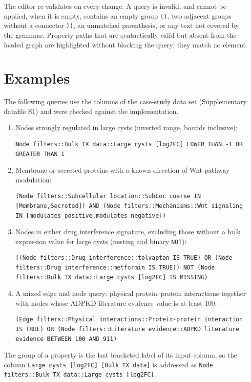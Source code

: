 \documentclass[10pt]{article}
\begin{document}
The editor re-validates on every change. A query is invalid, and cannot be
applied, when it is empty, contains an empty group \texttt{()}, two adjacent
groups without a connector \texttt{)(}, an unmatched parenthesis, or any text
not covered by the grammar. Property paths that are syntactically valid but
absent from the loaded graph are highlighted without blocking the query; they
match no element.

\section*{Examples}

The following queries use the columns of the case-study data set
(Supplementary datafile S1) and were checked against the implementation.

\begin{enumerate}
  \item Nodes strongly regulated in large cysts (inverted range, bounds
    inclusive):
\begin{lstlisting}
Node filters::Bulk TX data::Large cysts [log2FC] LOWER THAN -1 OR GREATER THAN 1
\end{lstlisting}
  \item Membrane or secreted proteins with a known direction of Wnt pathway
    modulation:
\begin{lstlisting}
(Node filters::Subcellular location::SubLoc coarse IN [Membrane,Secreted]) AND (Node filters::Mechanisms::Wnt signaling IN [modulates positive,modulates negative])
\end{lstlisting}
  \item Nodes in either drug interference signature, excluding those without a
    bulk expression value for large cysts (nesting and binary \texttt{NOT}):
\begin{lstlisting}
((Node filters::Drug interference::tolvaptan IS TRUE) OR (Node filters::Drug interference::metformin IS TRUE)) NOT (Node filters::Bulk TX data::Large cysts [log2FC] IS MISSING)
\end{lstlisting}
  \item A mixed edge and node query: physical protein--protein interactions
    together with nodes whose ADPKD literature evidence value is at least 100:
\begin{lstlisting}
(Edge filters::Physical interactions::Protein-protein interaction IS TRUE) OR (Node filters::Literature evidence::ADPKD literature evidence BETWEEN 100 AND 911)
\end{lstlisting}
\end{enumerate}

The group of a property is the last bracketed label of its input column, so the
column \texttt{Large cysts [log2FC] [Bulk TX data]} is addressed as
\texttt{Node filters::Bulk TX data::Large cysts [log2FC]}.
\end{document}
